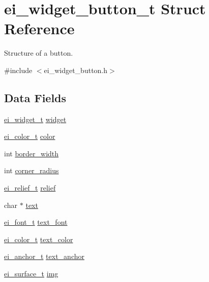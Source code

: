 \hypertarget{structei__widget__button__t}{\section{ei\-\_\-widget\-\_\-button\-\_\-t Struct Reference}
\label{structei__widget__button__t}
}


Structure of a button.  




{\ttfamily \#include $<$ei\-\_\-widget\-\_\-button.\-h$>$}

\subsection*{Data Fields}
\begin{DoxyCompactItemize}
\item 
\hyperlink{structei__widget__t}{ei\-\_\-widget\-\_\-t} \hyperlink{structei__widget__button__t_acf769e84e4a3cd0201c019998850deef}{widget}
\item 
\hyperlink{structei__color__t}{ei\-\_\-color\-\_\-t} \hyperlink{structei__widget__button__t_a9fb4cdb0541591221c5dcfc88dc869b9}{color}
\item 
int \hyperlink{structei__widget__button__t_a6bcd339f4094c369a4542e71dcd46ae6}{border\-\_\-width}
\item 
int \hyperlink{structei__widget__button__t_a34822359cc6bd4a196b9ccc545441748}{corner\-\_\-radius}
\item 
\hyperlink{ei__types_8h_aa79a32b1d8ece0e44cfa394e870b270b}{ei\-\_\-relief\-\_\-t} \hyperlink{structei__widget__button__t_a96c4fa4a563064cc4cb67066fbbddc2b}{relief}
\item 
char $\ast$ \hyperlink{structei__widget__button__t_a3baa34b73437e99f2f0e162351a3ba84}{text}
\item 
\hyperlink{ei__types_8h_a22c8198e4d641e4bc67bb17f9c6bcda7}{ei\-\_\-font\-\_\-t} \hyperlink{structei__widget__button__t_ad619e741a38f68fda98a9c9405225123}{text\-\_\-font}
\item 
\hyperlink{structei__color__t}{ei\-\_\-color\-\_\-t} \hyperlink{structei__widget__button__t_a938724ea59ccdfbcbada1b237ad14640}{text\-\_\-color}
\item 
\hyperlink{ei__types_8h_a3852c963af609d31d7cfcff79c4c8450}{ei\-\_\-anchor\-\_\-t} \hyperlink{structei__widget__button__t_a2897e23a54ab047beb6203d835191e8e}{text\-\_\-anchor}
\item 
\hyperlink{hw__interface_8h_ad9970ae727c438faaf09c58c5defb796}{ei\-\_\-surface\-\_\-t} \hyperlink{structei__widget__button__t_a6bae8ac3b27a453f7a56299a2ed58ac7}{img}

\end{DoxyCompactItemize}
